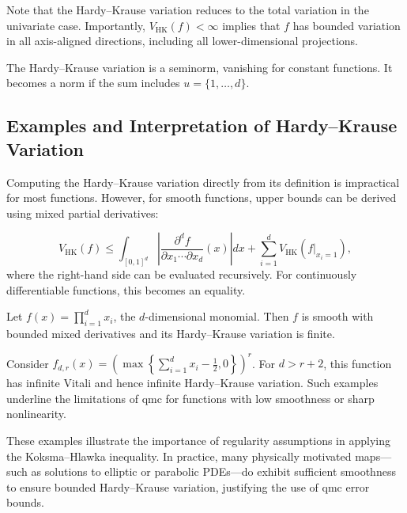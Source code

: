 Note that the Hardy--Krause variation reduces to the total variation in the univariate case. Importantly, $V_{\mathrm{HK}}(f) < \infty$ implies that $f$ has bounded variation in all axis-aligned directions, including all lower-dimensional projections.

\begin{remark}
The Hardy--Krause variation is a seminorm, vanishing for constant functions. It becomes a norm if the sum includes $u = \{1,\dots,d\}$.
\end{remark}

  \subsection{Examples and Interpretation of Hardy--Krause Variation}
  \label{sec:hk-examples}

Computing the Hardy--Krause variation directly from its definition is impractical for most functions. However, for smooth functions, upper bounds can be derived using mixed partial derivatives:

\begin{equation*}
    V_{\mathrm{HK}}(f) \leq \int_{[0,1]^d} \left| \frac{\partial^d f}{\partial x_1 \cdots \partial x_d}(x) \right| dx + \sum_{i=1}^d V_{\mathrm{HK}}(f|_{x_i = 1}),
\end{equation*}
where the right-hand side can be evaluated recursively. For continuously differentiable functions, this becomes an equality.

\begin{example}
Let $f(x) = \prod_{i=1}^d x_i$, the $d$-dimensional monomial. Then $f$ is smooth with bounded mixed derivatives and its Hardy--Krause variation is finite.
\end{example}

\begin{example}
Consider $f_{d,r}(x) = \left( \max\left\{ \sum_{i=1}^d x_i - \frac{1}{2}, 0
\right\} \right)^r$. For $d > r + 2$, this function has infinite Vitali and
hence infinite Hardy--Krause variation. Such examples underline the limitations
of \ac{qmc} for functions with low smoothness or sharp
nonlinearity\cite{owen2004multidimensional}.
\end{example}

These examples illustrate the importance of regularity assumptions in applying
the Koksma--Hlawka inequality. In practice, many physically motivated maps—such
as solutions to elliptic or parabolic PDEs—do exhibit sufficient smoothness to
ensure bounded Hardy--Krause variation, justifying the use of \ac{qmc} error
bounds.

